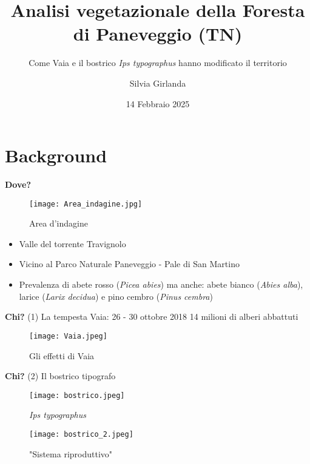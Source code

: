 \documentclass{beamer} %
\title{\textbf{Analisi vegetazionale della Foresta di Paneveggio (TN)}}
\subtitle {Come Vaia e il bostrico \textit{Ips typographus} hanno modificato il territorio }
\author{Silvia Girlanda}
\date{14 Febbraio 2025}
\begin{document}
\maketitle



\section{Background}

\begin{frame}{\textbf{Dove?}}
\begin{figure}
        \centering
        \texttt{[image: Area\_indagine.jpg]}
        \caption{\scriptsize Area d'indagine}
    \end{figure}
    
    \begin{itemize}
        \item Valle del torrente Travignolo
        \item Vicino al Parco Naturale Paneveggio - Pale di San Martino
        \item Prevalenza di abete rosso (\textit{Picea abies}) ma anche: abete bianco (\textit{Abies alba}), larice (\textit{Larix decidua}) e pino cembro (\textit{Pinus cembra})
    
    \end{itemize}
 \end{frame}

\begin{frame}{\textbf{Chi?} (1) La tempesta Vaia: 26 - 30 ottobre 2018 }
14 milioni di alberi abbattuti
\begin{figure}
    \centering
    \texttt{[image: Vaia.jpeg]}
    \caption{Gli effetti di Vaia}
    \label{fig:enter-label}
\end{figure}
\end{frame}

\begin{frame}{\textbf{Chi?} (2) Il bostrico tipografo}
\begin{figure}
    \centering
    \texttt{[image: bostrico.jpeg]}
    \caption{{\textit{Ips typographus}}}
    \texttt{[image: bostrico\_2.jpeg]}
    \caption{"Sistema riproduttivo"}
\end{figure}
\end{frame}
\end{document}
